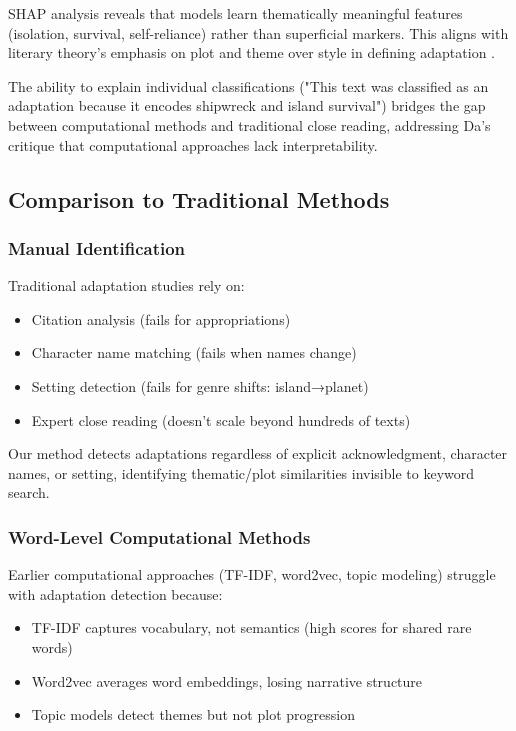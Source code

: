 \documentclass[12pt,a4paper]{article}
\begin{document}
SHAP analysis reveals that models learn thematically meaningful features (isolation, survival, self-reliance) rather than superficial markers. This aligns with literary theory's emphasis on plot and theme over style in defining adaptation \cite{Hutcheon2006}.

The ability to explain individual classifications ("This text was classified as an adaptation because it encodes shipwreck and island survival") bridges the gap between computational methods and traditional close reading, addressing Da's critique \cite{Da2019} that computational approaches lack interpretability.

\subsection{Comparison to Traditional Methods}

\subsubsection{Manual Identification}

Traditional adaptation studies rely on:
\begin{itemize}
    \item Citation analysis (fails for appropriations)
    \item Character name matching (fails when names change)
    \item Setting detection (fails for genre shifts: island→planet)
    \item Expert close reading (doesn't scale beyond hundreds of texts)
\end{itemize}

Our method detects adaptations regardless of explicit acknowledgment, character names, or setting, identifying thematic/plot similarities invisible to keyword search.

\subsubsection{Word-Level Computational Methods}

Earlier computational approaches (TF-IDF, word2vec, topic modeling) struggle with adaptation detection because:
\begin{itemize}
    \item TF-IDF captures vocabulary, not semantics (high scores for shared rare words)
    \item Word2vec averages word embeddings, losing narrative structure
    \item Topic models detect themes but not plot progression
\end{itemize}
\end{document}
